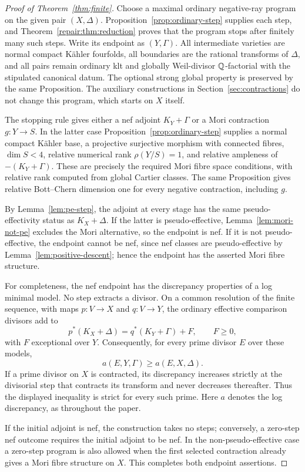 \begin{proof}[Proof of Theorem~\ref{thm:finite}]
Choose a maximal ordinary negative-ray program on the given pair
$(X,\Delta)$. Proposition~\ref{prop:ordinary-step} supplies each step,
and Theorem~\ref{repair:thm:reduction} proves that the program stops
after finitely many such steps. Write its endpoint as $(Y,\Gamma)$.
All intermediate varieties are normal compact Kähler fourfolds, all
boundaries are the rational transforms of $\Delta$, and all pairs remain
ordinary klt and globally Weil-divisor $\mathbb Q$-factorial with the stipulated
canonical datum.  The optional strong global property is preserved by the
same Proposition. The auxiliary constructions in
Section~\ref{sec:contractions} do not change this program, which starts
on $X$ itself.

The stopping rule gives either a nef adjoint $K_Y+\Gamma$ or a Mori
contraction $g:Y\to S$.  In the latter case
Proposition~\ref{prop:ordinary-step} supplies a normal compact Kähler base,
a projective surjective morphism with connected fibres, $\dim S<4$,
relative numerical rank $\rho(Y/S)=1$, and relative ampleness of
$-(K_Y+\Gamma)$.  These are precisely the required Mori fibre space
conditions, with relative rank computed from global Cartier classes.
The same Proposition gives relative Bott--Chern dimension one for every
negative contraction, including $g$.

By Lemma~\ref{lem:pe-step}, the adjoint at every stage has the same
pseudo-effectivity status as $K_X+\Delta$.  If the latter is
pseudo-effective, Lemma~\ref{lem:mori-not-pe} excludes the Mori alternative,
so the endpoint is nef.  If it is not pseudo-effective, the endpoint
cannot be nef, since nef classes are pseudo-effective by
Lemma~\ref{lem:positive-descent}; hence the endpoint has the asserted Mori
fibre structure.

For completeness, the nef endpoint has the discrepancy properties of a
log minimal model.  No step extracts a divisor.  On a common resolution of
the finite sequence, with maps $p:V\to X$ and $q:V\to Y$, the ordinary
effective comparison divisors add to
\[
 p^*(K_X+\Delta)=q^*(K_Y+\Gamma)+F,
 \qquad F\geq0,
\]
with $F$ exceptional over $Y$.  Consequently, for every prime divisor $E$
over these models,
\[
 a(E,Y,\Gamma)\geq a(E,X,\Delta).
\]
If a prime divisor on $X$ is contracted, its discrepancy increases strictly
at the divisorial step that contracts its transform and never decreases
thereafter.  Thus the displayed inequality is strict for every such
prime.  Here $a$ denotes the log discrepancy, as throughout the paper.

If the initial adjoint is nef, the construction takes no steps; conversely,
a zero-step nef outcome requires the initial adjoint to be nef.  In the
non-pseudo-effective case a zero-step program is also allowed when the
first selected contraction already gives a Mori fibre structure on $X$.
This completes both endpoint assertions.
\end{proof}

